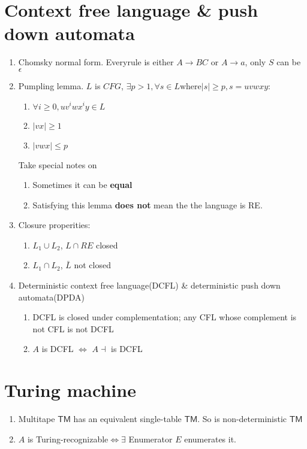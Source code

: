 \documentclass{article}
\newcommand{\TM}{\mathsf{TM}}
\newcommand{\TR}{Turing-recognizable}
\begin{document}
\section{Context free language \& push down automata}\begin{enumerate}
	\item Chomsky normal form. Everyrule is either $A \rightarrow BC$ or $A \rightarrow a$, only $S$ can be $\epsilon$
	\item Pumpling lemma. $L$ is $CFG$, $\exists p > 1, \forall s \in L \text{where} |s| \ge p, s = uvwxy$:
	\begin{enumerate}
		\item $\forall i \ge 0, uv^iwx^iy \in L$
		\item $|vx| \ge 1$
		\item $|vwx| \le p$
	\end{enumerate}
	Take special notes on
	\begin{enumerate}
		\item Sometimes it can be \textbf{equal}
		\item Satisfying this lemma \textbf{does not} mean the the language is RE.
	\end{enumerate}
	\item Closure properities:
	\begin{enumerate}
		\item $L_1 \cup L_2$, $L \cap RE$ closed
		\item $L_1 \cap L_2$, $\bar{L}$ not closed
	\end{enumerate}
	\item Deterministic context free language(DCFL) \& deterministic push down automata(DPDA)
	\begin{enumerate}
		\item DCFL is closed under complementation; any CFL whose complement is not CFL is not DCFL
		\item $A$ is DCFL $\Longleftrightarrow$ $A\dashv$ is DCFL
	\end{enumerate}
\end{enumerate}

\section{Turing machine}\begin{enumerate}
	\item Multitape $\TM$ has an equivalent single-table $\TM$. So is non-deterministic $\TM$
	\item $A$ is \TR $\Longleftrightarrow \exists$ Enumerator $E$ enumerates it.
\end{enumerate}
\end{document}

